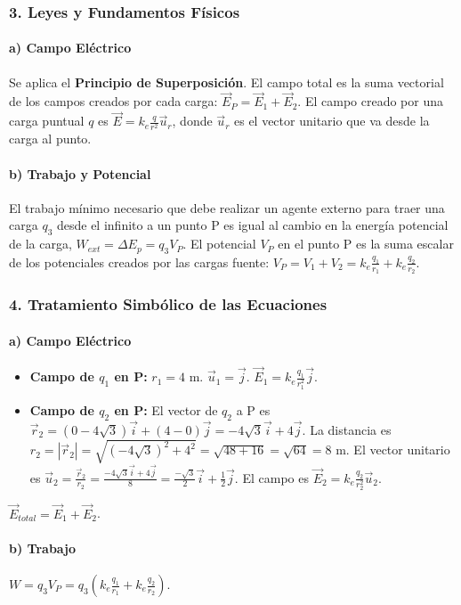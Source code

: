 \subsubsection*{3. Leyes y Fundamentos Físicos}
\paragraph{a) Campo Eléctrico} Se aplica el \textbf{Principio de Superposición}. El campo total es la suma vectorial de los campos creados por cada carga: $\vec{E}_P = \vec{E}_1 + \vec{E}_2$. El campo creado por una carga puntual $q$ es $\vec{E} = k_e \frac{q}{r^2} \vec{u}_r$, donde $\vec{u}_r$ es el vector unitario que va desde la carga al punto.
\paragraph{b) Trabajo y Potencial} El trabajo mínimo necesario que debe realizar un agente externo para traer una carga $q_3$ desde el infinito a un punto P es igual al cambio en la energía potencial de la carga, $W_{ext} = \Delta E_p = q_3 V_P$. El potencial $V_P$ en el punto P es la suma escalar de los potenciales creados por las cargas fuente: $V_P = V_1 + V_2 = k_e\frac{q_1}{r_1} + k_e\frac{q_2}{r_2}$.

\subsubsection*{4. Tratamiento Simbólico de las Ecuaciones}
\paragraph{a) Campo Eléctrico}
\begin{itemize}
    \item \textbf{Campo de $q_1$ en P:} $r_1=4$ m. $\vec{u}_1=\vec{j}$. $\vec{E}_1 = k_e \frac{q_1}{r_1^2}\vec{j}$.
    \item \textbf{Campo de $q_2$ en P:} El vector de $q_2$ a P es $\vec{r}_2 = (0-4\sqrt{3})\vec{i} + (4-0)\vec{j} = -4\sqrt{3}\vec{i} + 4\vec{j}$. La distancia es $r_2 = |\vec{r}_2| = \sqrt{(-4\sqrt{3})^2+4^2} = \sqrt{48+16} = \sqrt{64}=8$ m. El vector unitario es $\vec{u}_2 = \frac{\vec{r}_2}{r_2} = \frac{-4\sqrt{3}\vec{i} + 4\vec{j}}{8} = \frac{-\sqrt{3}}{2}\vec{i} + \frac{1}{2}\vec{j}$. El campo es $\vec{E}_2 = k_e \frac{q_2}{r_2^2}\vec{u}_2$.
\end{itemize}
$\vec{E}_{total} = \vec{E}_1 + \vec{E}_2$.

\paragraph{b) Trabajo}
$W = q_3 V_P = q_3 \left(k_e \frac{q_1}{r_1} + k_e \frac{q_2}{r_2}\right)$.

